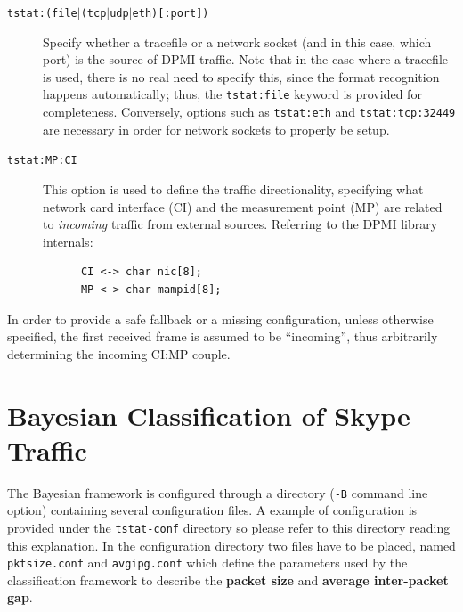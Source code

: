 \documentclass[11pt]{article}
\begin{document}
\begin{description}

\item[{\texttt{tstat:(file$|$(tcp$|$udp$|$eth)[:port])}}] \mbox{}

Specify whether a tracefile or a network socket (and in this case, which port)
is the source of DPMI traffic. Note that in the case where a tracefile
is used, there is no real need to specify this, since the format recognition
happens automatically; thus, the \texttt{tstat:file} keyword is provided for completeness.
Conversely, options such as \texttt{tstat:eth} and \texttt{tstat:tcp:32449} are
necessary in order for network sockets to properly be setup.


\item[{\texttt{tstat:MP:CI}}] \mbox{}

This option is used to define the traffic directionality, specifying 
what network card interface (CI) and the measurement point (MP) 
are related to \textit{incoming} traffic from external sources.
Referring to the DPMI library internals:

\begin{small}\begin{verbatim}
      CI <-> char nic[8];     
      MP <-> char mampid[8];
\end{verbatim}\end{small} \noindent
\end{description}


In order to provide a safe fallback or a missing configuration,
unless otherwise specified, the first received frame is assumed to 
be ``incoming'', thus arbitrarily determining the incoming CI:MP 
couple.

\section{Bayesian Classification of Skype Traffic\label{Bayesian_Classification_of_Skype_Traffic}}


The Bayesian framework is configured through a directory (\texttt{-B} command line option)
containing several configuration files. A example of configuration
is provided under the \texttt{tstat-conf} directory so please refer to this directory
reading this explanation. In the configuration directory 
two files have to be placed, named \texttt{pktsize.conf} and \texttt{avgipg.conf} which define
the parameters used by the classification framework to describe the
\textbf{packet size} and \textbf{average inter-packet gap}.
\end{document}
